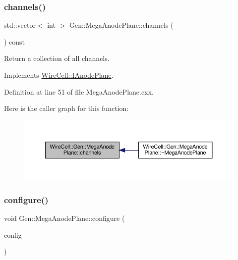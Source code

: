 \subsubsection{\texorpdfstring{channels()}{channels()}}
{\footnotesize\ttfamily std\+::vector$<$ int $>$ Gen\+::\+Mega\+Anode\+Plane\+::channels (\begin{DoxyParamCaption}{ }\end{DoxyParamCaption}) const\hspace{0.3cm}{\ttfamily [virtual]}}



Return a collection of all channels. 



Implements \hyperlink{class_wire_cell_1_1_i_anode_plane_a8de1ff56146e343b9ad266eaa011065a}{Wire\+Cell\+::\+I\+Anode\+Plane}.



Definition at line 51 of file Mega\+Anode\+Plane.\+cxx.

Here is the caller graph for this function\+:
\nopagebreak
\begin{figure}[H]
\begin{center}
\leavevmode
\includegraphics[width=350pt]{class_wire_cell_1_1_gen_1_1_mega_anode_plane_a1106718600e8a867efd62a7c9dedafd2_icgraph}
\end{center}
\end{figure}
\mbox{\label{class_wire_cell_1_1_gen_1_1_mega_anode_plane_a68669a57b1f5baa35fdbcc259e230fb4}} 
\subsubsection{\texorpdfstring{configure()}{configure()}}
{\footnotesize\ttfamily void Gen\+::\+Mega\+Anode\+Plane\+::configure (\begin{DoxyParamCaption}\item[{const \hyperlink{namespace_wire_cell_a9f705541fc1d46c608b3d32c182333ee}{Wire\+Cell\+::\+Configuration} \&}]{config }\end{DoxyParamCaption})\hspace{0.3cm}{\ttfamily [virtual]}}



